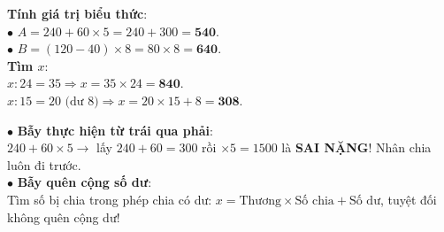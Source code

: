 \documentclass[14pt,a4paper,oneside]{extbook}
\begin{document}
\noindent
\begin{minipage}[t]{0.53\textwidth}
  \begin{tcolorbox}[
    enhanced,
    title={\footnotesize\bfseries\color{white}\faCheckCircle\ Ví dụ thực hành chuẩn mực},
    colback=green!2!white,
    colframe=green!60!black,
    arc=2.5mm, boxrule=0.8pt, top=1.8mm, bottom=1.8mm, left=2.2mm, right=2.2mm
  ]
    \footnotesize
    \textbf{Tính giá trị biểu thức}:\\
    $\bullet$ $A = 240 + 60 \times 5 = 240 + 300 = \mathbf{540}$.\\
    $\bullet$ $B = (120 - 40) \times 8 = 80 \times 8 = \mathbf{640}$.\\[1mm]
    \textbf{Tìm $x$}:\\
    $x : 24 = 35 \Rightarrow x = 35 \times 24 = \mathbf{840}$.\\
    $x : 15 = 20\text{ (dư 8)} \Rightarrow x = 20 \times 15 + 8 = \mathbf{308}$.
  \end{tcolorbox}
\end{minipage}%
\hfill
\begin{minipage}[t]{0.45\textwidth}
  \begin{tcolorbox}[
    enhanced,
    title={\footnotesize\bfseries\color{white}\faExclamationTriangle\ Mẹo tránh bẫy trắc nghiệm},
    colback=red!2!white,
    colframe=red!70!black,
    arc=2.5mm, boxrule=0.8pt, top=1.8mm, bottom=1.8mm, left=2.2mm, right=2.2mm
  ]
    \footnotesize
    $\bullet$ \textbf{Bẫy thực hiện từ trái qua phải}:\\
    $240 + 60 \times 5 \rightarrow$ lấy $240 + 60 = 300$ rồi $\times 5 = 1500$ là \textbf{SAI NẶNG}! Nhân chia luôn đi trước.\\
    $\bullet$ \textbf{Bẫy quên cộng số dư}:\\
    Tìm số bị chia trong phép chia có dư: $x = \text{Thương} \times \text{Số chia} + \text{Số dư}$, tuyệt đối không quên cộng dư!
  \end{tcolorbox}
\end{minipage}
\end{document}
